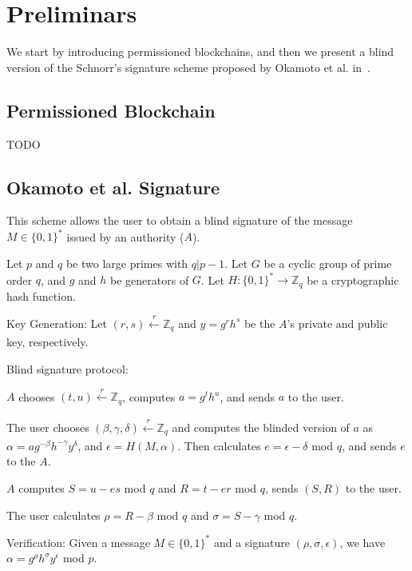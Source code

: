 \documentclass[conference]{llncs}
\begin{document}
\section{Preliminars} \label{back}

We start by introducing permissioned blockchains, and then we present a blind version of the Schnorr's signature scheme proposed by Okamoto et al. in~\cite{okamoto1992provably}.

\subsection{Permissioned Blockchain}
\label{Permissioned}
TODO

\subsection{Okamoto et al. Signature}
\label{Okamoto}

This scheme allows the user to obtain a blind signature of the message $M\in \{0,1\}^*$ issued by an authority ($A$). 

\begin{definition}
Let $p$ and $q$ be two large primes with $q|p-1$. Let $G$ be a cyclic group of prime order $q$, and $g$ and $h$ be generators of $G$. Let $H:\{0,1\}^*\rightarrow \mathbb{Z}_q$ be a cryptographic hash function.
\begin{compactdesc}
\item[Key Generation:] Let $(r,s) \xleftarrow[]{r}\mathbb{Z}_q$ and $y=g^rh^s$ be the $A$'s private and public key, respectively.
\item[Blind signature protocol:]
\begin{compactenum}
    \item $A$ chooses $(t,u) \xleftarrow[]{r}\mathbb{Z}_q$, computes $a = g^th^u$, and sends $a$ to the user.
    \item The user chooses $(\beta, \gamma, \delta) \xleftarrow[]{r}\mathbb{Z}_q$ and computes the blinded version of $a$ as $\alpha=ag^{-\beta} h^{-\gamma} y^\delta$, and $\epsilon=H(M,\alpha)$. Then calculates $e=\epsilon-\delta$ mod $q$, and sends $e$ to the $A$.
    \item $A$ computes $S=u-es$ mod $q$ and $R=t-er$ mod $q$, sends $(S,R)$ to the user.
    \item The user calculates $\rho=R-\beta$ mod $q$ and $\sigma=S-\gamma$ mod $q$.
\end{compactenum}
\item[Verification:] Given a message $M\in \{0,1\}^*$ and a signature $(\rho,\sigma,\epsilon)$, we have $\alpha=g^\rho h^\sigma y^\epsilon$ mod $p$.
\end{compactdesc}
\end{definition}
\end{document}

